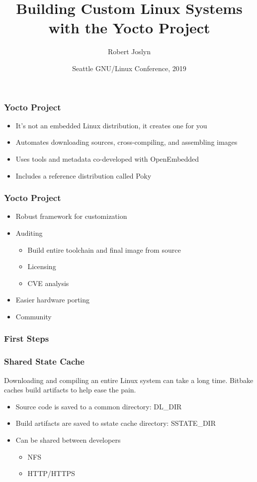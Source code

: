 \documentclass[aspectratio=169]{beamer}
\title{Building Custom Linux Systems with the Yocto Project}
\author[RJ]{Robert Joslyn}
\institute[SEL]{Schweitzer Engineering Laboratories}
\date[SeaGL]{Seattle GNU/Linux Conference, 2019}
\begin{document}
\frame{\titlepage}

\begin{frame}
\frametitle{Yocto Project}
\begin{itemize}
	\item It's not an embedded Linux distribution, it creates one for
	      you
	\item Automates downloading sources, cross-compiling, and
	      assembling images
	\item Uses tools and metadata co-developed with OpenEmbedded
	\item Includes a reference distribution called Poky
\end{itemize}
\end{frame}

\begin{frame}
\frametitle{Yocto Project}
\begin{itemize}
	\item Robust framework for customization
	\item Auditing
	\begin{itemize}
		\item Build entire toolchain and final image from source
		\item Licensing
		\item CVE analysis
	\end{itemize}
	\item Easier hardware porting
	\item Community
\end{itemize}
\end{frame}

\begin{frame}[fragile]
\frametitle{First Steps}
\begin{block}{}
\end{block}
\end{frame}

\begin{frame}
\frametitle{Shared State Cache}
Downloading and compiling an entire Linux system can take a long time.
Bitbake caches build artifacts to help ease the pain.
\begin{itemize}
	\item Source code is saved to a common directory: DL\_DIR
	\item Build artifacts are saved to sstate cache directory:
	      SSTATE\_DIR
	\item Can be shared between developers
	\begin{itemize}
		\item NFS
		\item HTTP/HTTPS
	\end{itemize}
\end{itemize}
\end{frame}
\end{document}
